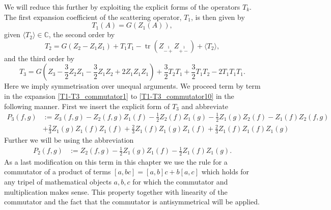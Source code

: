 \documentclass[oneside,reqno,12pt]{amsart}
\DeclareMathOperator{\tr}{tr}
\begin{document}
We will reduce this further by exploiting the explicit forms of the operators \(T_k\).
The first expansion coefficient of the scattering operator, \(T_1\), is then given by 
\begin{equation}
T_1(A)=G(Z_1(A)),
\end{equation}
given \(\langle T_2 \rangle \in \mathbb{C}\), the second order by 
\begin{equation}\label{expT2}
T_2=G(Z_2-Z_1Z_1)+T_1T_1 -\tr \left(Z_{\stackrel{1}{-+}}Z_{\stackrel{1}{+-}}\right) + \langle T_2\rangle,
\end{equation}
and the third order by
\begin{equation}
T_3=G\left( Z_3 - \frac{3}{2}Z_2Z_1 - \frac{3}{2}Z_1Z_2 + 2 Z_1Z_1Z_1\right)+ \frac{3}{2}T_2T_1 + \frac{3}{2} T_1T_2 - 2 T_1T_1T_1 
.\end{equation}
Here we imply symmetrisation over unequal arguments. We proceed term by term in the expansion \eqref{T1-T3_commutator1} to \eqref{T1-T3_commutator10} in the following manner. First we insert the explicit form of \(T_3\) and abbreviate
\begin{align}\tag*{}
P_3(f,g)&:=Z_3(f,g) -Z_2(f,g) Z_1(f)-\frac{1}{2}Z_2(f) Z_1(g)
 - \frac{1}{2}Z_1(g)Z_2(f)- Z_1(f)Z_2(f,g)\\
  &+ \frac{2}{3} Z_1(g)Z_1(f)Z_1(f)
+ \frac{2}{3} Z_1(f)Z_1(g)Z_1(f)+ \frac{2}{3} Z_1(f)Z_1(f)Z_1(g)
\end{align}  
Further we will be using the abbreviation
\begin{align}\tag*{}
P_2(f,g)&:=Z_2(f,g) -\frac{1}{2}Z_1(g) Z_1(f)-\frac{1}{2}Z_1(f) Z_1(g).
\end{align}  
As a last modification on this term in this chapter we use the rule for a commutator of a product of terms \(\left[a,bc\right]=\left[a,b\right]c + b\left[a,c\right]\) which holds for any tripel of mathematical objects \(a,b,c\) for which the commutator and multiplication makes sense. This property together with linearity of the commutator and the fact that the commutator is antisymmetrical will be applied.
\end{document}
